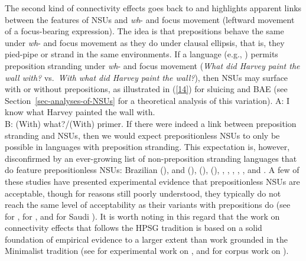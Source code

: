 The second kind of connectivity effects goes back to \citet{Merchant2001, Merchant2005a} and highlights apparent links between the features of NSUs and \emph{wh}- and focus movement (leftward movement of a focus-bearing expression). The idea is that prepositions behave the same under \emph{wh}- and focus movement as they do under clausal ellipsis, that is, they pied-pipe or strand in the same environments. If a language (e.g., ) permits preposition stranding under \emph{wh}- and focus movement (\emph{What did Harvey paint the wall with?} vs.\ \emph{With what did Harvey paint the wall?}), then NSUs may surface with or without prepositions, as illustrated in (\ref{14}) for sluicing and BAE (see Section~\ref{sec-analyses-of-NSUs} for a theoretical analysis of this variation).
%
\ea A: I know what Harvey painted the wall with.\\B: (With) what?/(With) primer.\label{14}\z
%
If there were indeed a link between preposition stranding and NSUs, then we would expect prepositionless NSUs to only be possible in languages with preposition stranding. This expectation is, however, disconfirmed by an ever-growing list of non-preposition stranding languages that do feature prepositionless NSUs: Brazilian  (\citealt{AlmeidaYoshida2007}),  and  (\citealt{Rodrigues2006}),  (\citealt{Molimpakis2018}),  (\citealt{Fortin2007}), %
  \citep{Philippova2014},  \citep{Szczegielniak2008, Sag2011, Nykiel2013}, %
 \citep{Abels2017},  \citep{Stjepanovic2008, Stjepanovic2012},  \citep{Abeille2019}, and %
 \citep{Leung2014, Alshaalan2020}. A few of these studies have presented experimental evidence that prepositionless NSUs are acceptable, though for reasons still poorly understood, they typically do not reach the same level of acceptability as their variants with prepositions do (see \citealt{Nykiel2013} for , \citealt{Molimpakis2018} for , and \citealt{Alshaalan2020} for Saudi ). It is worth noting in this regard that the work on connectivity effects that follows the HPSG tradition is based on a solid foundation of empirical evidence to a larger extent than work grounded in the Minimalist tradition (see \citealt{Sag2011, Nykiel2013} for experimental work on , and \citealt{Nykiel2015, Nykiel2017, Nykiel2020} for corpus work on ).

